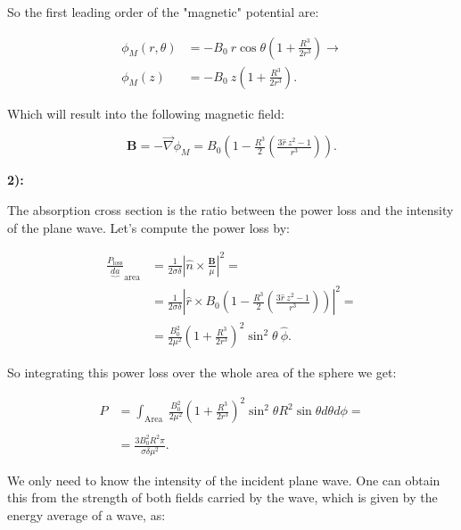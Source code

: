 So the first leading order of the "magnetic" potential are:

\begin{equation}
	\begin{split}
		\phi_{M}(r,\theta) &= -B_{0}\: r \cos\theta \left(1+ \tfrac{R^{3}}{2r^{3}}\right) \rightarrow \\
		\phi_{M}(z) &= -B_{0}\: z\left(1+ \tfrac{R^{3}}{2r^{3}}\right).
	\end{split}
\end{equation}

Which will result into the following magnetic field:

\begin{equation}
	\mathbf{B}= -\vec{\nabla}\phi_{M} = B_{0}\left(1- \tfrac{R^{3}}{2}\left(\tfrac{3\hat{r}\:z^{2}-1}{r^{3}}\right)\right).
\end{equation}

\textbf{2):}

The absorption cross section is the ratio between the power loss and the intensity of the plane wave.  Let's compute the power loss by:

\begin{equation}
	\begin{split}
		\frac{P_{\mathrm{loss}}}{\underbrace{d a}}_{\text{area}} &= \frac{1}{2 \sigma \delta}  \left|\hat{n} \times \tfrac{\mathbf{B}}{\mu}\right|^{2} = \\
		&= \frac{1}{2\sigma\delta} \left| \hat{r} \times B_{0}\left(1- \tfrac{R^{3}}{2}\left(\tfrac{3\hat{r}\:z^{2}-1}{r^{3}}\right)\right)\right|^{2}=\\
		&= \frac{B_{0}^{2}}{2\mu^{2}}\left( 1+ \tfrac{R^{3}}{2r^{3}} \right)^{2} \sin^{2}\theta \:\hat{\phi}.
	\end{split}
\end{equation}

So integrating this power loss over the whole area of the sphere we get:

\begin{equation}
	\begin{split}
		P &= \int_{\text{Area}} \: \frac{B_{0}^{2}}{2\mu^{2}}\left( 1+ \tfrac{R^{3}}{2r^{3}} \right)^{2} \sin^{2}\theta R^{2} \sin\theta d\theta d\phi=\\
		&\\
		&= \frac{3B_{0}^{2}R^{2}\pi}{\sigma \delta \mu^{2}}.
	\end{split}
\end{equation}

We only need to know the intensity of the incident plane wave. One can obtain this from the strength of both fields carried by the wave, which is given by the energy average of a wave, as:


